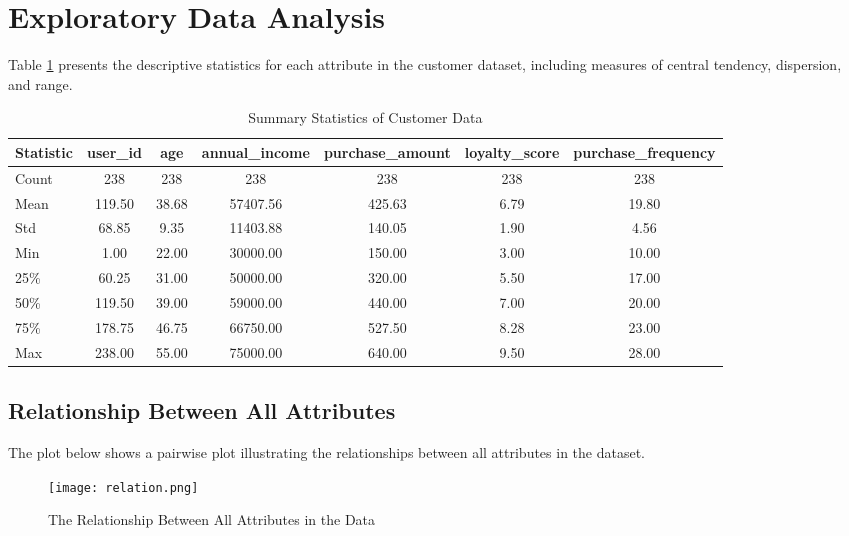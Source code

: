 \documentclass[11pt]{article}
\begin{document}
\section{Exploratory Data Analysis}
Table \ref{tab:summary_statistics} presents the descriptive statistics for each attribute in the customer dataset, including measures of central tendency, dispersion, and range.
\begin{table}[H]
    \centering
    \caption{Summary Statistics of Customer Data}
    \begin{tabular}{lcccccc}
        \hline
        \textbf{Statistic} & \textbf{user\_id} & \textbf{age} & \textbf{annual\_income} & \textbf{purchase\_amount} & \textbf{loyalty\_score} & \textbf{purchase\_frequency} \\
        \hline
        Count & 238 & 238 & 238 & 238 & 238 & 238 \\
        Mean & 119.50 & 38.68 & 57407.56 & 425.63 & 6.79 & 19.80 \\
        Std & 68.85 & 9.35 & 11403.88 & 140.05 & 1.90 & 4.56 \\
        Min & 1.00 & 22.00 & 30000.00 & 150.00 & 3.00 & 10.00 \\
        25\% & 60.25 & 31.00 & 50000.00 & 320.00 & 5.50 & 17.00 \\
        50\% & 119.50 & 39.00 & 59000.00 & 440.00 & 7.00 & 20.00 \\
        75\% & 178.75 & 46.75 & 66750.00 & 527.50 & 8.28 & 23.00 \\
        Max & 238.00 & 55.00 & 75000.00 & 640.00 & 9.50 & 28.00 \\
        \hline
    \end{tabular}
    \label{tab:summary_statistics}
\end{table}
\newpage
\subsection{Relationship Between All Attributes}
The plot below shows a pairwise plot illustrating the relationships between all attributes in the dataset.
\begin{figure}[H]
    \centering
    \texttt{[image: relation.png]}
    \caption{The Relationship Between All Attributes in the Data}
    \label{fig:relation}
\end{figure}
\end{document}
